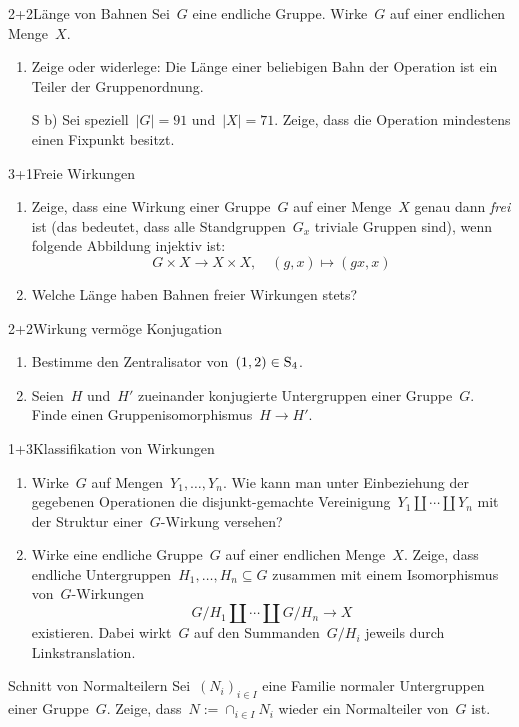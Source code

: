 \documentclass{algblatt}
\begin{document}

\begin{aufgabe}{2+2}{Länge von Bahnen}
Sei~$G$ eine endliche Gruppe. Wirke~$G$ auf einer endlichen Menge~$X$.
\begin{enumerate}
\item Zeige oder widerlege: Die Länge einer beliebigen Bahn der Operation ist
ein Teiler der Gruppenordnung.
\item[S b)]
Sei speziell~$|G| = 91$ und~$|X| = 71$. Zeige, dass die Operation mindestens
einen Fixpunkt besitzt.
\end{enumerate}
\end{aufgabe}

\begin{aufgabe}{3+1}{Freie Wirkungen}
\begin{enumerate}
\item Zeige, dass eine Wirkung einer Gruppe~$G$ auf einer Menge~$X$
genau dann \emph{frei} ist (das bedeutet, dass alle
Standgruppen~$G_x$ triviale Gruppen sind), wenn folgende Abbildung injektiv
ist:
\[ G \times X \longrightarrow X \times X, \quad
  (g,x) \mapsto (gx, x) \]
\item Welche Länge haben Bahnen freier Wirkungen stets?
\end{enumerate}
\end{aufgabe}

\begin{aufgabe}{2+2}{Wirkung vermöge Konjugation}
\begin{enumerate}
\item Bestimme den Zentralisator von~$(1,2) \in \mathrm{S}_4$.
\item Seien~$H$ und~$H'$ zueinander konjugierte Untergruppen einer Gruppe~$G$.
Finde einen Gruppenisomorphismus~$H \to H'$.
\end{enumerate}
\end{aufgabe}

\begin{aufgabe}{1+3}{Klassifikation von Wirkungen}
\begin{enumerate}
\item Wirke~$G$ auf Mengen~$Y_1,\ldots,Y_n$. Wie kann man unter Einbeziehung
der gegebenen Operationen die disjunkt-gemachte
Vereinigung~$Y_1 \amalg \cdots \amalg Y_n$ mit der Struktur einer~$G$-Wirkung versehen?
\item
Wirke eine endliche Gruppe~$G$ auf einer endlichen Menge~$X$. Zeige, dass
endliche Untergruppen~$H_1,\ldots,H_n \subseteq G$ zusammen mit einem Isomorphismus
von~$G$-Wirkungen
\[ G/H_1 \amalg \cdots \amalg G/H_n \longrightarrow X \]
existieren. Dabei wirkt~$G$ auf den Summanden~$G/H_i$ jeweils durch
Linkstranslation.
\end{enumerate}
\end{aufgabe}

\begin{aufgabe}{4}{Schnitt von Normalteilern}
Sei~$(N_i)_{i \in I}$ eine Familie normaler Untergruppen
einer Gruppe~$G$. Zeige, dass~$N := \cap_{i \in I} N_i$ wieder ein Normalteiler von~$G$
ist.
\end{aufgabe}
\end{document}
